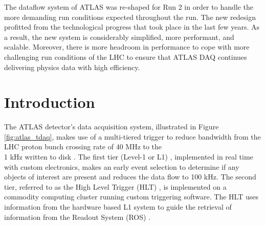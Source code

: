 The dataflow system of ATLAS was re-shaped for Run 2 in order to handle the 
 more demanding run conditions expected throughout the run. The new redesign 
profitted from the technological progress 
that took place in the last few years. As a result, the new system 
is considerably simplified, more performant, and scalable. Moreover,
there is more headroom in performance to cope with more challenging run conditions
of the LHC to ensure that ATLAS DAQ continues delivering physics data with high efficiency. 


\section{Introduction}\label{sec:intro}

The ATLAS \cite{atlas} detector's data acquisition system, illustrated in Figure \ref{fig:atlas_tdaq}, makes use of a multi-tiered trigger to reduce 
bandwidth from the LHC proton bunch crossing rate of 40 MHz
to the \\1 kHz written to disk \cite{evolution}. The first tier (Level-1 or L1) \cite{l1}, implemented in real time with custom electronics, 
makes an early event selection to determine if any objects of interest are present and reduces the data flow to 
100 kHz. The second tier, referred to as the High Level Trigger (HLT) \cite{hlt}, is implemented on a commodity computing cluster running custom triggering software. The HLT uses information from the
hardware based L1 system to guide the retrieval of information from the Readout System (ROS) \cite{ros}. 

